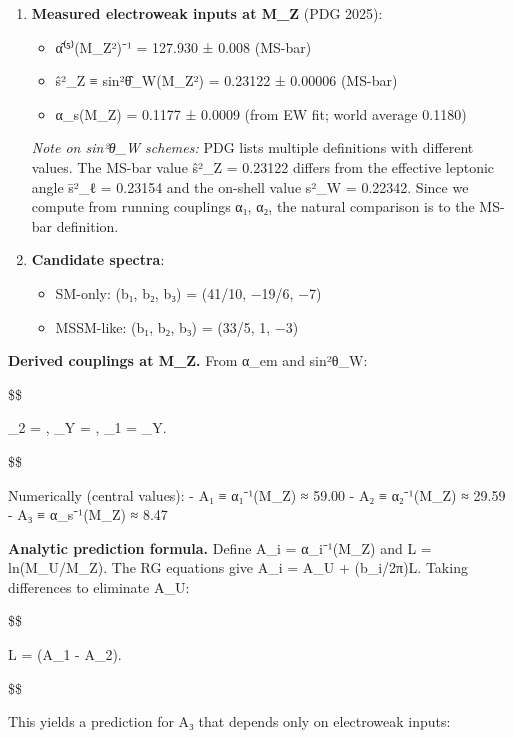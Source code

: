 \documentclass[11pt,a4paper]{article}
\theoremstyle{remark}
\providecommand{\tightlist}{%
  \setlength{\itemsep}{0pt}\setlength{\parskip}{0pt}}
\begin{document}
\begin{enumerate}
\def\labelenumi{\arabic{enumi}.}
\setcounter{enumi}{2}
\item
  \textbf{Measured electroweak inputs at M\_Z} (PDG 2025):

  \begin{itemize}
  \tightlist
  \item
    α̂⁽⁵⁾(M\_Z²)⁻¹ = 127.930 ± 0.008 (MS-bar)
  \item
    ŝ²\_Z ≡ sin²θ̂\_W(M\_Z²) = 0.23122 ± 0.00006 (MS-bar)
  \item
    α\_s(M\_Z) = 0.1177 ± 0.0009 (from EW fit; world average 0.1180)
  \end{itemize}

  \emph{Note on sin²θ\_W schemes:} PDG lists multiple definitions with different values.
  The MS-bar value ŝ²\_Z = 0.23122 differs from the effective leptonic angle
  s̄²\_ℓ = 0.23154 and the on-shell value s²\_W = 0.22342. Since we compute from
  running couplings α₁, α₂, the natural comparison is to the MS-bar definition.
\item
  \textbf{Candidate spectra}:

  \begin{itemize}
  \tightlist
  \item
    SM-only: (b₁, b₂, b₃) = (41/10, −19/6, −7)
  \item
    MSSM-like: (b₁, b₂, b₃) = (33/5, 1, −3)
  \end{itemize}
\end{enumerate}

\textbf{Derived couplings at M\_Z.} From α\_em and sin²θ\_W:

\$\$

\alpha\_2 = , \quad
\alpha\_Y = , \quad
\alpha\_1 = \alpha\_Y.

\$\$

Numerically (central values):
- A₁ ≡ α₁⁻¹(M\_Z) ≈ 59.00
- A₂ ≡ α₂⁻¹(M\_Z) ≈ 29.59
- A₃ ≡ α\_s⁻¹(M\_Z) ≈ 8.47

\textbf{Analytic prediction formula.} Define A\_i = α\_i⁻¹(M\_Z) and
L = ln(M\_U/M\_Z). The RG equations give A\_i = A\_U + (b\_i/2π)L. Taking
differences to eliminate A\_U:

\$\$

L = (A\_1 - A\_2).

\$\$

This yields a prediction for A₃ that depends only on electroweak inputs:
\end{document}

